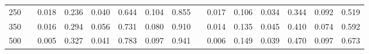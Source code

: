 % 
\begin{tabular}{ccccccccccccccc}
  \hline
  \hline
250 &  & 0.018 & 0.236 & 0.040 & 0.644 & 0.104 & 0.855 &  & 0.017 & 0.106 & 0.034 & 0.344 & 0.092 & 0.519 \\ 
  350 &  & 0.016 & 0.294 & 0.056 & 0.731 & 0.080 & 0.910 &  & 0.014 & 0.135 & 0.045 & 0.410 & 0.074 & 0.592 \\ 
  500 &  & 0.005 & 0.327 & 0.041 & 0.783 & 0.097 & 0.941 &  & 0.006 & 0.149 & 0.039 & 0.470 & 0.097 & 0.673 \\ 
   \hline
\end{tabular}

